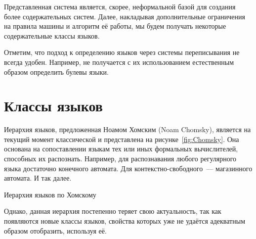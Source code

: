 Представленная система является, скорее, неформальной базой для создания более содержательных систем.
Далее, накладывая дополнительные ограничения на правила машины и алгоритм её работы, мы будем получать некоторые содержательные классы языков.

Отметим, что подход к определению языков через системы переписывания не всегда удобен. Например, не получается с их использованием естественным образом определить булевы языки.

\section{Классы языков}

Иерархия языков, предложенная Ноамом Хомским (Noam Chomsky), является на текущий момент классической и представлена на рисунке~\ref{fig:Chomsky}.
Она основана на сопоставлении языкам тех или иных формальных вычислителей, способных их распознать.
Например, для распознавания любого регулярного языка достаточно конечного автомата. Для контекстно-свободного~--- магазинного автомата. И так далее.
\begin{marginfigure}
    \begin{center}
    \end{center}
    \caption{Иерархия языков по Хомскому}
    \label{fig:Chomsky}
\end{marginfigure}

Однако, данная иерархия постепенно теряет свою актуальность, так как появляются новые классы языков, свойства которых уже не удаётся адекватным образом отобразить, используя её.

